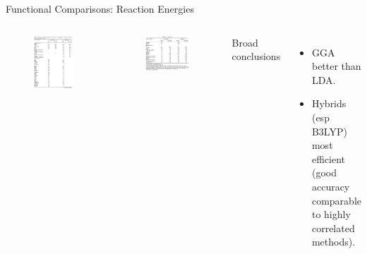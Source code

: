 \documentclass[aspectratio=169]{beamer}
\begin{document}
\begin{frame}{Functional Comparisons: Reaction Energies}
\begin{columns}
\begin{figure}
    \centering
    \includegraphics[width=0.8\linewidth]{lectures/figures/6_rxn_energies1.png}
    \end{figure}

\begin{figure}
    \centering
    \includegraphics[width=0.5\linewidth]{lectures/figures/6_rxn_energies2.png}
\end{figure}
Broad conclusions
\begin{itemize}
    \item GGA better than LDA.
    \item Hybrids (esp B3LYP) most efficient (good accuracy comparable to highly correlated methods).
\end{itemize}

\end{columns} 

\end{frame} 
\end{document}
